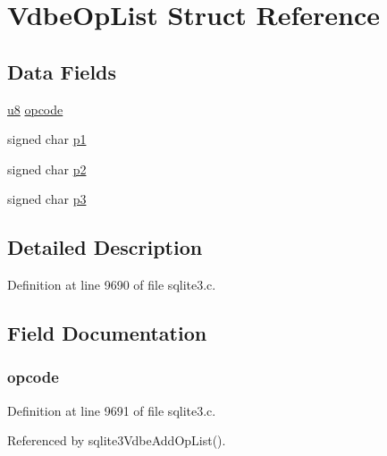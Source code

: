 \hypertarget{struct_vdbe_op_list}{}\section{Vdbe\+Op\+List Struct Reference}
\label{struct_vdbe_op_list}
\subsection*{Data Fields}
\begin{DoxyCompactItemize}
\item 
\hyperlink{sqlite3_8c_a74a0f6424ae628af25f23f0a35f6ead3}{u8} \hyperlink{struct_vdbe_op_list_a2edfbd2b9bfd9c14b79dd26ffd02d88f}{opcode}
\item 
signed char \hyperlink{struct_vdbe_op_list_afe6d13ea5cb534abc24487d50f1d57e4}{p1}
\item 
signed char \hyperlink{struct_vdbe_op_list_ab590063439391b08f4e8168bb5fcae9e}{p2}
\item 
signed char \hyperlink{struct_vdbe_op_list_a0a6d80174d3bd39c3b901cf5582bb28c}{p3}
\end{DoxyCompactItemize}


\subsection{Detailed Description}


Definition at line 9690 of file sqlite3.\+c.



\subsection{Field Documentation}
\hypertarget{struct_vdbe_op_list_a2edfbd2b9bfd9c14b79dd26ffd02d88f}{}
\subsubsection[{opcode}]{ opcode}\label{struct_vdbe_op_list_a2edfbd2b9bfd9c14b79dd26ffd02d88f}


Definition at line 9691 of file sqlite3.\+c.



Referenced by sqlite3\+Vdbe\+Add\+Op\+List().

\hypertarget{struct_vdbe_op_list_afe6d13ea5cb534abc24487d50f1d57e4}{}
